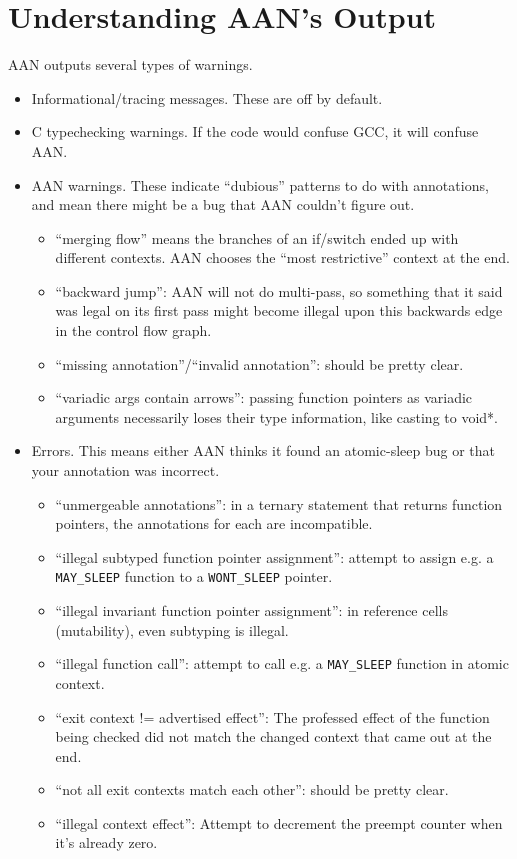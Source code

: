 \documentclass{article}
\begin{document}
\section{Understanding AAN's Output}

AAN outputs several types of warnings.

\begin{itemize}
	\item Informational/tracing messages. These are off by default.
	\item C typechecking warnings. If the code would confuse GCC, it will confuse AAN.
	\item AAN warnings. These indicate ``dubious'' patterns to do with annotations, and mean there might be a bug that AAN couldn't figure out.
		\begin{itemize}
			\item ``merging flow'' means the branches of an if/switch ended up with different contexts. AAN chooses the ``most restrictive'' context at the end.
			\item ``backward jump'': AAN will not do multi-pass, so something that it said was legal on its first pass might become illegal upon this backwards edge in the control flow graph.
			\item ``missing annotation''/``invalid annotation'': should be pretty clear.
			\item ``variadic args contain arrows'': passing function pointers as variadic arguments necessarily loses their type information, like casting to void*.
		\end{itemize}
	\item Errors. This means either AAN thinks it found an atomic-sleep bug or that your annotation was incorrect.
		\begin{itemize}
			\item ``unmergeable annotations'': in a ternary statement that returns function pointers, the annotations for each are incompatible.
			\item ``illegal subtyped function pointer assignment'': attempt to assign e.g. a \texttt{MAY\_SLEEP} function to a \texttt{WONT\_SLEEP} pointer.
			\item ``illegal invariant function pointer assignment'': in reference cells (mutability), even subtyping is illegal.
			\item ``illegal function call'': attempt to call e.g. a \texttt{MAY\_SLEEP} function in atomic context.
			\item ``exit context != advertised effect'': The professed effect of the function being checked did not match the changed context that came out at the end.
			\item ``not all exit contexts match each other'': should be pretty clear.
			\item ``illegal context effect'': Attempt to decrement the preempt counter when it's already zero.
		\end{itemize}
\end{itemize}
\end{document}
